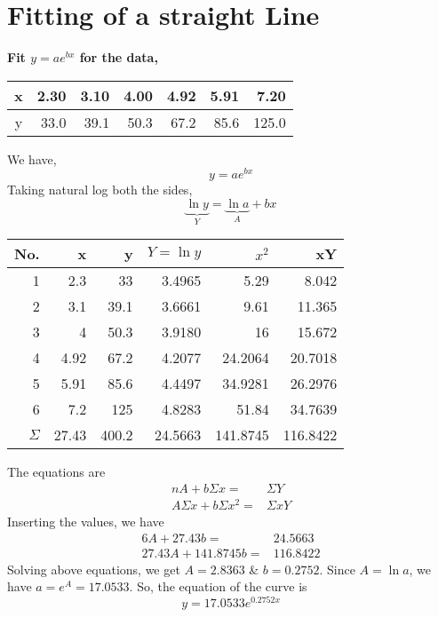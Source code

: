 \documentclass[]{book}
\begin{document}
\chapter{Fitting of a straight Line}
\textbf{Fit $y = ae^{bx}$ for the data,}
\begin{center}
\begin{tabular}{|c|r|r|r|r|r|r|}
\hline
x & 2.30 & 3.10 & 4.00 & 4.92 & 5.91 & 7.20\\
\hline
y & 33.0 & 39.1 & 50.3 & 67.2 & 85.6 & 125.0\\
\hline
\end{tabular}
\end{center}
We have,
$$ y = ae^{bx}$$
Taking natural log both the sides,
$$ \underbrace{\ln y}_{Y} = \underbrace{\ln a}_{A} +bx$$
\begin{center}
\begin{tabular}{|r|r|r|r|r|r|}
\hline
No. & x & y & $Y = \ln y$ & $x^{2}$ & xY\\
\hline
1 & 2.3 & 33 &	3.4965 & 	5.29 & 8.042\\
\hline
2 & 3.1 & 	39.1 & 	3.6661 & 	9.61	 & 11.365\\
\hline
3 & 4 &	50.3 & 	3.9180 & 	16 & 	15.672\\
\hline
4 & 4.92 & 	67.2 & 	4.2077 & 	24.2064 & 	20.7018\\
\hline
5 & 5.91 & 	85.6 & 	4.4497 & 	34.9281 &	26.2976\\
\hline
6 & 7.2 & 	125 & 	4.8283 & 51.84 & 	34.7639\\
\hline
$\Sigma$ & 27.43 & 	400.2 & 	24.5663 & 	141.8745 & 	116.8422\\
\hline
\end{tabular}
\end{center}
The equations are
\begin{eqnarray}
\nonumber nA +b\Sigma x =& \Sigma Y\\
\nonumber A\Sigma x + b\Sigma x^{2} =& \Sigma xY
\end{eqnarray}
Inserting the values, we have
\begin{eqnarray}
\nonumber 6A + 27.43b =& 24.5663\\
\nonumber 27.43A + 141.8745b =& 116.8422
\end{eqnarray}
Solving above equations, we get $A =  2.8363$ \& $b = 0.2752$. Since $ A = \ln a$, we have $ a = e^{A} = 17.0533$. So, the equation of the curve is $$y=17.0533e^{0.2752x}$$

\end{document}
